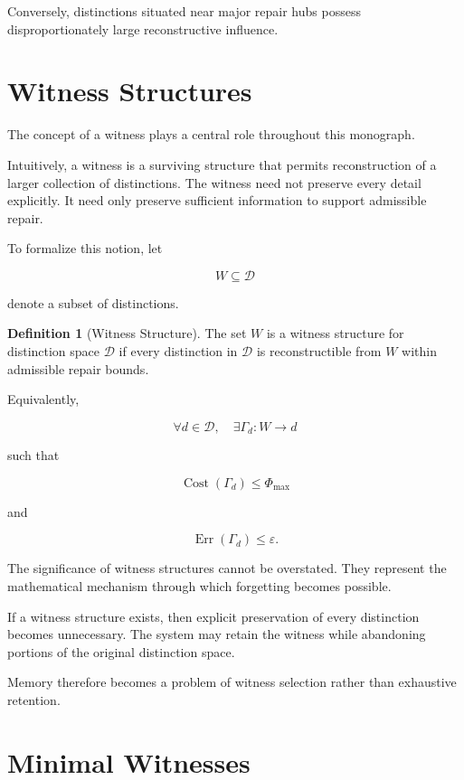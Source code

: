 \documentclass[12pt,oneside]{book}
\theoremstyle{plain} \newtheorem{theorem}{Theorem}[chapter] \newtheorem{lemma}[theorem]{Lemma} \newtheorem{proposition}[theorem]{Proposition} \newtheorem{corollary}[theorem]{Corollary}
\theoremstyle{definition} \newtheorem{definition}[theorem]{Definition} \newtheorem{axiom}[theorem]{Axiom} \newtheorem{construction}[theorem]{Construction}
\theoremstyle{remark} \newtheorem{remark}[theorem]{Remark} \newtheorem{example}[theorem]{Example}
\newcommand{\D}{\mathcal{D}} \newcommand{\R}{\mathcal{R}} \newcommand{\F}{\mathcal{F}} \newcommand{\U}{\mathcal{U}} \newcommand{\M}{\mathcal{M}} \newcommand{\G}{\Gamma}
\begin{document}
Conversely, distinctions situated near major repair hubs possess disproportionately large reconstructive influence.

\section{Witness Structures}

The concept of a witness plays a central role throughout this monograph.

Intuitively, a witness is a surviving structure that permits reconstruction of a larger collection of distinctions. The witness need not preserve every detail explicitly. It need only preserve sufficient information to support admissible repair.

To formalize this notion, let

\[
W\subseteq\D
\]

denote a subset of distinctions.

\begin{definition}[Witness Structure]

The set $W$ is a witness structure for distinction space $\D$ if every distinction in $\D$ is reconstructible from $W$ within admissible repair bounds.

\end{definition}

Equivalently,

\[
\forall d\in\D,
\quad
\exists \Gamma_d
:
W
\rightarrow
d
\]

such that

\[
\operatorname{Cost}(\Gamma_d)
\leq
\Phi_{\max}
\]

and

\[
\operatorname{Err}(\Gamma_d)
\leq
\varepsilon.
\]

The significance of witness structures cannot be overstated. They represent the mathematical mechanism through which forgetting becomes possible.

If a witness structure exists, then explicit preservation of every distinction becomes unnecessary. The system may retain the witness while abandoning portions of the original distinction space.

Memory therefore becomes a problem of witness selection rather than exhaustive retention.

\section{Minimal Witnesses}
\end{document}
